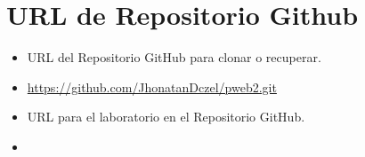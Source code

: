 	\section{URL de Repositorio Github}
	\begin{itemize}
            \item URL del Repositorio GitHub para clonar o recuperar.
            \item \url{https://github.com/JhonatanDczel/pweb2.git}
            \item URL para el laboratorio \itemPracticeNumber{} en el Repositorio GitHub.
            \item \itemUrl
	\end{itemize}
